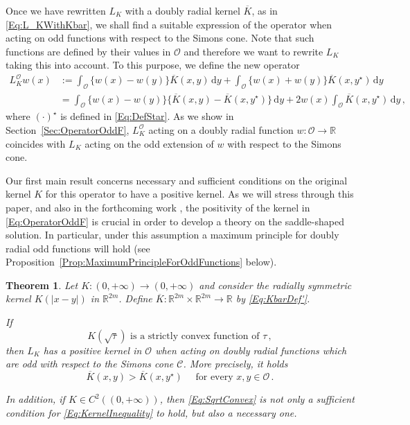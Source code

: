 \documentclass[12pt,reqno]{amsart}
\newtheorem{theorem}{Theorem}[section]
\theoremstyle{definition}
\theoremstyle{remark}
\newcommand{\con}[1]{\mathbb{#1}}
\newcommand{\R}{\con{R}} %
\newcommand{\ccal}{\mathscr{C}}
\newcommand{\ocal}{\mathcal{O}}
\renewcommand{\d}{\,\mathrm{d}} %
\numberwithin{equation}{section}
\begin{document}
	
	Once we have rewritten $L_K$ with a doubly radial kernel $\overline{K}$, as in \eqref{Eq:L_KWithKbar}, we shall find a suitable expression of the operator when acting on odd functions with respect to the Simons cone. Note that such functions are defined by their values in $\ocal$ and therefore we want to rewrite $L_K$ taking this into account. To this purpose, we define the new operator
	\begin{equation}
	\label{Eq:OperatorOddF}
	\begin{split}
	L_K^\ocal w (x)  &:= \int_{\ocal} \{w(x) - w(y) \} \overline{K}(x, y) \d y +  \int_{\ocal} \{w(x) + w(y) \} \overline{K}(x, y^\star) \d y \\
	&= \int_{\ocal} \{w(x) - w(y) \} \{\overline{K}(x, y) - \overline{K}(x, y^\star)  \} \d y +  2 w(x) \int_{\ocal} \overline{K}(x, y^\star) \d y \,,
	\end{split}
	\end{equation}
	where $(\cdot)^\star$ is defined in \eqref{Eq:DefStar}. As we show in Section~\ref{Sec:OperatorOddF}, $L_K^\ocal$ acting on a doubly radial function $w:\ocal \to \R$ coincides with $L_K$ acting on the odd extension of $w$ with respect to the Simons cone.
	
	Our first main result concerns necessary and sufficient conditions on the original kernel $K$ for this operator to have a positive kernel.  As we will stress through this paper, and also in the forthcoming work \cite{FelipeSanz-Perela:IntegroDifferentialII}, the positivity of the kernel in \eqref{Eq:OperatorOddF} is crucial in order to develop a theory on the saddle-shaped solution. In particular, under this assumption a maximum principle for doubly radial odd functions will hold (see Proposition~\ref{Prop:MaximumPrincipleForOddFunctions} below).
	
	\begin{theorem}
		\label{Th:SufficientNecessaryConditions}
		Let $K:(0,+\infty) \to (0,+\infty)$ and consider the radially symmetric kernel $K(|x-y|)$ in $\R^{2m}$. Define $\overline{K} : \R^{2m}\times \R^{2m} \to \R$ by \eqref{Eq:KbarDef'}.
		
		If 
		\begin{equation}
		\label{Eq:SqrtConvex}	
		K(\sqrt{\tau}) \text{ is a strictly convex function of }\tau\,,
		\end{equation}
		then $L_K$ has a positive kernel in $\ocal$ when acting on doubly radial functions which are odd with respect to the Simons cone $\ccal$. More precisely, it holds
		\begin{equation}
		\label{Eq:KernelInequality}
		\overline{K}(x,y) > \overline{K}(x, y^\star) \quad \text{ for every }x,y \in \ocal\,.
		\end{equation}
		
		In addition, if $K\in C^2((0,+\infty))$, then \eqref{Eq:SqrtConvex} is not only a sufficient condition for \eqref{Eq:KernelInequality} to hold, but also a necessary one.
	\end{theorem}
	
\end{document}
